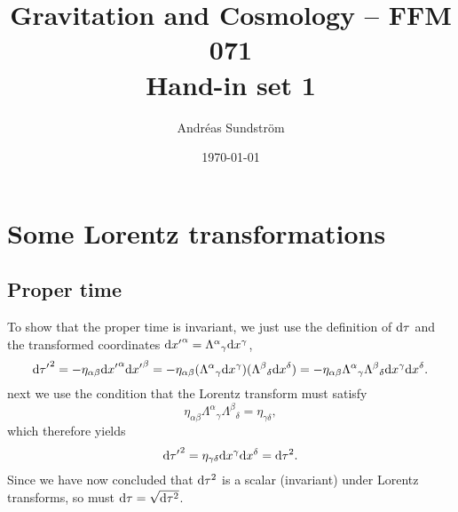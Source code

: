 \documentclass[11pt,a4paper, 
swedish, english %
]{article}
\begin{document}


%


\title{Gravitation and Cosmology -- FFM 071
\\ {\Large Hand-in set 1} }
\author{Andréas Sundström}
\date{\today}

\maketitle


\newcommand{\EM}{\text{EM}}

\section{Some Lorentz transformations}


\subsection{Proper time}
To show that the proper time is invariant, we just use the definition
of $\mathrm{d}\tau$ and the transformed coordinates 
$\mathrm{d}{x'}^\alpha={\Lambda^\alpha}_\gamma \mathrm{d}{x}^{\gamma}$,
\begin{equation}
\mathrm{d}{\tau'}^2=-\eta_{\alpha\beta}\mathrm{d}{x'}^{\alpha}\mathrm{d}{x'}^{\beta}
=-\eta_{\alpha\beta}({\Lambda^\alpha}_\gamma \mathrm{d}{x}^{\gamma})
({\Lambda^\beta}_\delta\mathrm{d}{x}^{\delta})
=-\eta_{\alpha\beta}{\Lambda^\alpha}_\gamma{\Lambda^\beta}_\delta
\mathrm{d}{x}^{\gamma}\mathrm{d}{x}^{\delta}.
\end{equation}
next we use the condition that the Lorentz transform must satisfy
\begin{equation}
\eta_{\alpha\beta}{\Lambda^\alpha}_\gamma{\Lambda^\beta}_\delta
=\eta_{\gamma\delta},
\end{equation}
which therefore yields
\begin{equation}
\mathrm{d}{\tau'}^2=\eta_{\gamma\delta}\mathrm{d}{x}^{\gamma}\mathrm{d}{x}^{\delta}
=\mathrm{d}\tau^2.
\end{equation}
Since we have now concluded that $\mathrm{d}\tau^2$ is a scalar (invariant)
under Lorentz transforms, so must $\mathrm{d}\tau=\sqrt{\mathrm{d}\tau^2}$.
\end{document}
